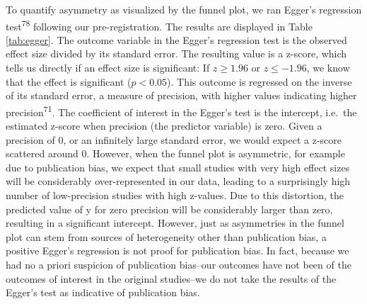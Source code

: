 \documentclass[
  man]{apa6}
\begin{document}
To quantify asymmetry as visualized by the funnel plot, we ran Egger's regression test\textsuperscript{78} following our pre-registration. The results are displayed in Table \ref{tab:egger}. The outcome variable in the Egger's regression test is the observed effect size divided by its standard error. The resulting value is a z-score, which tells us directly if an effect size is significant: If \(z \geq 1.96\) or \(z \leq -1.96\), we know that the effect is significant (\(p < 0.05\)). This outcome is regressed on the inverse of its standard error, a measure of precision, with higher values indicating higher precision\textsuperscript{71}. The coefficient of interest in the Egger's test is the intercept, i.e.~the estimated z-score when precision (the predictor variable) is zero. Given a precision of 0, or an infinitely large standard error, we would expect a z-score scattered around 0. However, when the funnel plot is asymmetric, for example due to publication bias, we expect that small studies with very high effect sizes will be considerably over-represented in our data, leading to a surprisingly high number of low-precision studies with high z-values. Due to this distortion, the predicted value of y for zero precision will be considerably larger than zero, resulting in a significant intercept. However, just as asymmetries in the funnel plot can stem from sources of heterogeneity other than publication bias, a positive Egger's regression is not proof for publication bias. In fact, because we had no a priori suspicion of publication bias--our outcomes have not been of the outcomes of interest in the original studies--we do not take the results of the Egger's test as indicative of publication bias.
\end{document}
